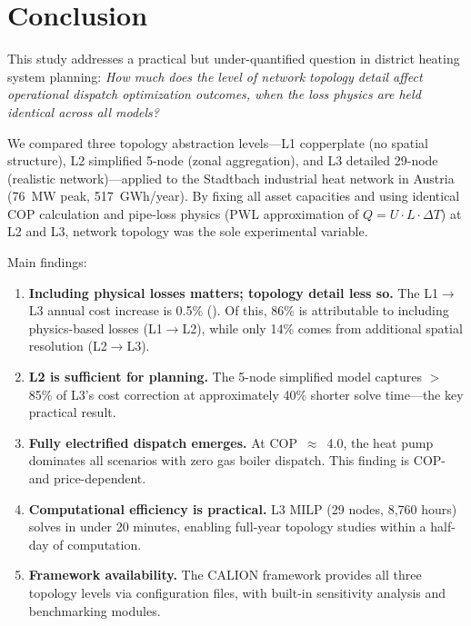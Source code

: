 \documentclass[a4paper,fleqn]{cas-dc}
\begin{document}
\section{Conclusion}\label{sec:conclusion}

This study addresses a practical but under-quantified question in district heating system planning: \emph{How much does the level of network topology detail affect operational dispatch optimization outcomes, when the loss physics are held identical across all models?}

We compared three topology abstraction levels---L1 copperplate (no spatial structure), L2 simplified 5-node (zonal aggregation), and L3 detailed 29-node (realistic network)---applied to the Stadtbach industrial heat network in Austria (\SI{76}{MW} peak, \SI{517}{GWh/year}). By fixing all asset capacities and using identical COP calculation and pipe-loss physics (PWL approximation of $Q = U \cdot L \cdot \Delta T$) at L2 and L3, network topology was the sole experimental variable.

Main findings:

\begin{enumerate}
\item \textbf{Including physical losses matters; topology detail less so.} The L1$\to$L3 annual cost increase is 0.5\% (). Of this, 86\% is attributable to including physics-based losses (L1$\to$L2), while only 14\% comes from additional spatial resolution (L2$\to$L3).

\item \textbf{L2 is sufficient for planning.} The 5-node simplified model captures $>$85\% of L3's cost correction at approximately 40\% shorter solve time---the key practical result.

\item \textbf{Fully electrified dispatch emerges.} At COP~$\approx$~4.0, the heat pump dominates all scenarios with zero gas boiler dispatch. This finding is COP- and price-dependent.

\item \textbf{Computational efficiency is practical.} L3 MILP (29 nodes, 8,760 hours) solves in under 20 minutes, enabling full-year topology studies within a half-day of computation.

\item \textbf{Framework availability.} The CALION framework provides all three topology levels via configuration files, with built-in sensitivity analysis and benchmarking modules.
\end{enumerate}
\end{document}
